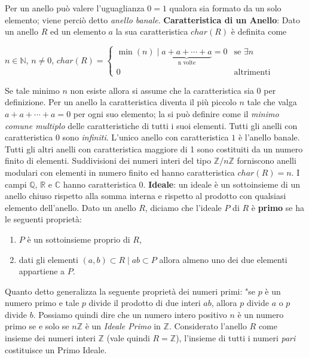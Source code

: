 \documentclass[a4paper,12pt]{tesiinfo}
\begin{document}
\newline
Per un anello pu\`o valere l'uguaglianza $0 = 1$ qualora sia formato da un solo elemento; viene perci\`o detto \textit{anello banale}.
\newline\newline
%
%
%
\textbf{Caratteristica di un Anello}: Dato un anello $R$ ed un elemento $a$ la sua caratteristica $char(R)$ \`e definita come \begin{center} $n  \in \mathbb{N}$, $n \ne 0 $, $char(R) = \begin{cases} \min (n) \mid \underbrace{a+a+\cdots+a}_\text{n volte} = 0 & \mbox{se }\exists n\\
0 & \mbox{altrimenti}
\end{cases}$
\end{center}
Se tale minimo $n$ non esiste allora si assume che la caratteristica sia 0 per definizione.
Per un anello la caratteristica diventa il pi\`u piccolo $n$ tale che valga $a+a+\cdots+a{{=}}0$ per ogni suo elemento; la si pu\`o definire come il \textit{minimo comune multiplo} delle caratteristiche di tutti i suoi elementi. 
Tutti gli anelli con caratteristica $0$ sono \textit{infiniti}.
\newline
L'unico anello con caratteristica $1$ \`e l'anello banale.
\newline
Tutti gli altri anelli con caratteristica maggiore di 1 sono costituiti da un numero finito di elementi. Suddivisioni dei numeri interi del tipo $\mathbb{Z}/n\mathbb{Z}$ forniscono anelli modulari con elementi in numero finito ed hanno caratteristica $char(R) = n$.\newline
I campi $\mathbb{Q}$, $\mathbb{R}$ e $\mathbb{C}$ hanno caratteristica $0$.
\newline\newline
%
%
%
\textbf{Ideale}: un ideale \`e un sottoinsieme di un anello chiuso rispetto alla somma interna e rispetto al prodotto con qualsiasi elemento dell'anello.
Dato un anello $R$, diciamo che l'ideale $P$ di $R$ \`e \textbf{primo} se ha le seguenti propriet\`a:
\begin{enumerate}
    \item $P$ \`e un sottoinsieme proprio di $R$,
    \item dati gli elementi $(a, b) \subset R \mid ab \subset P$ allora almeno uno dei due elementi appartiene a $P$.
\end{enumerate}
Quanto detto generalizza la seguente propriet\`a dei numeri primi: "se $p$ \`e un numero primo e tale $p$ divide il prodotto di due interi $ab$, allora $p$ divide $a$ o $p$ divide $b$. Possiamo quindi dire che un numero intero positivo $n$ \`e un numero primo se e solo se $n\mathbb{Z}$ \`e un \textit{Ideale Primo} in $\mathbb{Z}$. Considerato l'anello $R$ come insieme dei numeri interi $\mathbb{Z}$ (vale quindi $R = \mathbb{Z}$), l'insieme di tutti i numeri \textit{pari} costituisce un Primo Ideale.
\end{document}
